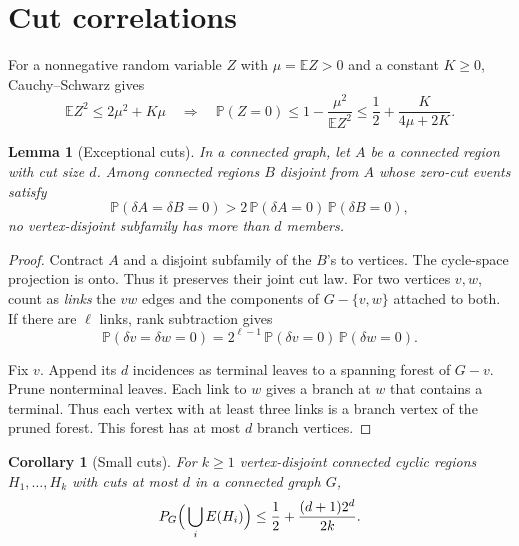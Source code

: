 \documentclass[11pt,a4paper]{article}
\numberwithin{equation}{section}
\newtheorem{lemma}[theorem]{Lemma}
\newtheorem{corollary}[theorem]{Corollary}
\theoremstyle{definition}
\theoremstyle{remark}
\newcommand{\E}{\mathbb E}
\newcommand{\Prob}{\mathbb P}
\begin{document}
\section{Cut correlations}\label{sec:cuts}
For a nonnegative random variable $Z$ with $\mu=\E Z>0$ and a constant $K\ge0$, Cauchy--Schwarz gives
\begin{equation}\label{eq:second-moment}
 \E Z^2\le2\mu^2+K\mu\quad\Longrightarrow\quad\Prob(Z=0)\le1-\frac{\mu^2}{\E Z^2}\le\frac12+\frac K{4\mu+2K}.
\end{equation}

\begin{lemma}[Exceptional cuts]\label{lem:exceptional}
In a connected graph, let $A$ be a connected region with cut size $d$. Among connected regions $B$ disjoint from $A$ whose zero-cut events satisfy
\[
 \Prob(\delta A=\delta B=0)>2\,\Prob(\delta A=0)\,\Prob(\delta B=0),
\]
no vertex-disjoint subfamily has more than $d$ members.
\end{lemma}

\begin{proof}
Contract $A$ and a disjoint subfamily of the $B$'s to vertices. The cycle-space projection is onto. Thus it preserves their joint cut law. For two vertices $v,w$, count as \emph{links} the $vw$ edges and the components of $G-\{v,w\}$ attached to both. If there are $\ell$ links, rank subtraction gives
\begin{equation}\label{eq:ratio}
 \Prob(\delta v=\delta w=0)=2^{\ell-1}\,\Prob(\delta v=0)\,\Prob(\delta w=0).
\end{equation}

Fix $v$. Append its $d$ incidences as terminal leaves to a spanning forest of $G-v$. Prune nonterminal leaves. Each link to $w$ gives a branch at $w$ that contains a terminal. Thus each vertex with at least three links is a branch vertex of the pruned forest. This forest has at most $d$ branch vertices.
\end{proof}

\begin{corollary}[Small cuts]\label{cor:small-cuts}
For $k\ge1$ vertex-disjoint connected cyclic regions $H_1,\ldots,H_k$ with cuts at most $d$ in a connected graph $G$,
\begin{equation}\label{eq:small-cuts}
 P_G\Bigl(\,\bigcup_iE(H_i)\Bigr)\le\frac12+\frac{(d+1)2^d}{2k}.
\end{equation}
\end{corollary}
\end{document}
